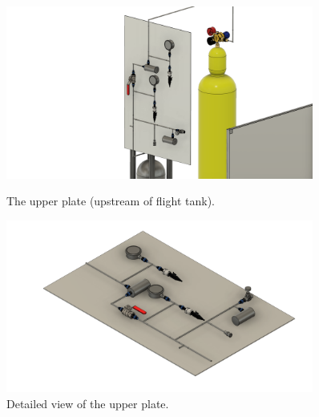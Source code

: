 \documentclass[9pt]{article} %
\numberwithin{equation}{section} %
\begin{document}
\begin{figure}
    \centering
    \begin{minipage}{0.49\textwidth}
        \centering
        \includegraphics[scale=0.5, width=0.9\textwidth, trim={5cm 0cm 5cm 0cm}, clip]{system_cad_files/master_upper_plate.png} %
        \caption{The upper plate (upstream of flight tank).}
        \label{fig:upper_plate}
    \end{minipage}\hfill
    \begin{minipage}{0.49\textwidth}
        \centering
        \includegraphics[scale=0.5, width=0.9\textwidth, trim={6cm 0cm 4cm 0cm}, clip]{system_cad_files/master_board_v40.png} %
        \caption{Detailed view of the upper plate.}
        \label{fig:upper_plate_detailed}
    \end{minipage}
\end{figure} 
\end{document}
